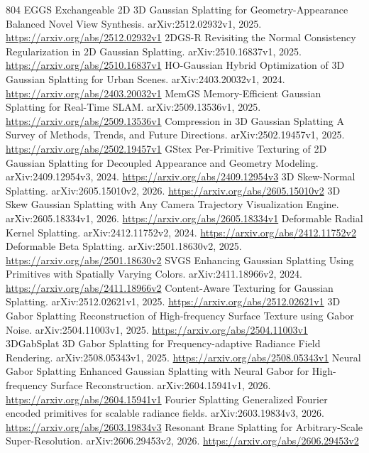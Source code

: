 \documentclass[11pt]{article}
\begin{document}
\begin{thebibliography}{804}
 EGGS Exchangeable 2D 3D Gaussian Splatting for Geometry-Appearance Balanced Novel View Synthesis. arXiv:2512.02932v1, 2025. \url{https://arxiv.org/abs/2512.02932v1}
 2DGS-R Revisiting the Normal Consistency Regularization in 2D Gaussian Splatting. arXiv:2510.16837v1, 2025. \url{https://arxiv.org/abs/2510.16837v1}
 HO-Gaussian Hybrid Optimization of 3D Gaussian Splatting for Urban Scenes. arXiv:2403.20032v1, 2024. \url{https://arxiv.org/abs/2403.20032v1}
 MemGS Memory-Efficient Gaussian Splatting for Real-Time SLAM. arXiv:2509.13536v1, 2025. \url{https://arxiv.org/abs/2509.13536v1}
 Compression in 3D Gaussian Splatting A Survey of Methods, Trends, and Future Directions. arXiv:2502.19457v1, 2025. \url{https://arxiv.org/abs/2502.19457v1}
 GStex Per-Primitive Texturing of 2D Gaussian Splatting for Decoupled Appearance and Geometry Modeling. arXiv:2409.12954v3, 2024. \url{https://arxiv.org/abs/2409.12954v3}
 3D Skew-Normal Splatting. arXiv:2605.15010v2, 2026. \url{https://arxiv.org/abs/2605.15010v2}
 3D Skew Gaussian Splatting with Any Camera Trajectory Visualization Engine. arXiv:2605.18334v1, 2026. \url{https://arxiv.org/abs/2605.18334v1}
 Deformable Radial Kernel Splatting. arXiv:2412.11752v2, 2024. \url{https://arxiv.org/abs/2412.11752v2}
 Deformable Beta Splatting. arXiv:2501.18630v2, 2025. \url{https://arxiv.org/abs/2501.18630v2}
 SVGS Enhancing Gaussian Splatting Using Primitives with Spatially Varying Colors. arXiv:2411.18966v2, 2024. \url{https://arxiv.org/abs/2411.18966v2}
 Content-Aware Texturing for Gaussian Splatting. arXiv:2512.02621v1, 2025. \url{https://arxiv.org/abs/2512.02621v1}
 3D Gabor Splatting Reconstruction of High-frequency Surface Texture using Gabor Noise. arXiv:2504.11003v1, 2025. \url{https://arxiv.org/abs/2504.11003v1}
 3DGabSplat 3D Gabor Splatting for Frequency-adaptive Radiance Field Rendering. arXiv:2508.05343v1, 2025. \url{https://arxiv.org/abs/2508.05343v1}
 Neural Gabor Splatting Enhanced Gaussian Splatting with Neural Gabor for High-frequency Surface Reconstruction. arXiv:2604.15941v1, 2026. \url{https://arxiv.org/abs/2604.15941v1}
 Fourier Splatting Generalized Fourier encoded primitives for scalable radiance fields. arXiv:2603.19834v3, 2026. \url{https://arxiv.org/abs/2603.19834v3}
 Resonant Brane Splatting for Arbitrary-Scale Super-Resolution. arXiv:2606.29453v2, 2026. \url{https://arxiv.org/abs/2606.29453v2}

\end{thebibliography}
\end{document}
